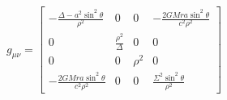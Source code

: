 $$
    g_{\mu \nu}=\left[\begin{array}{cccc}
            -\frac{\Delta-a^2 \sin ^2 \theta}{\rho^2}    & 0                     & 0      & -\frac{2 G M r a \sin ^2 \theta}{c^2 \rho^2} \\
            0                                            & \frac{\rho^2}{\Delta} & 0      & 0                                            \\
            0                                            & 0                     & \rho^2 & 0                                            \\
            -\frac{2 G M r a \sin ^2 \theta}{c^2 \rho^2} & 0                     & 0      & \frac{\Sigma^2 \sin ^2 \theta}{\rho^2}
        \end{array}\right]
$$

